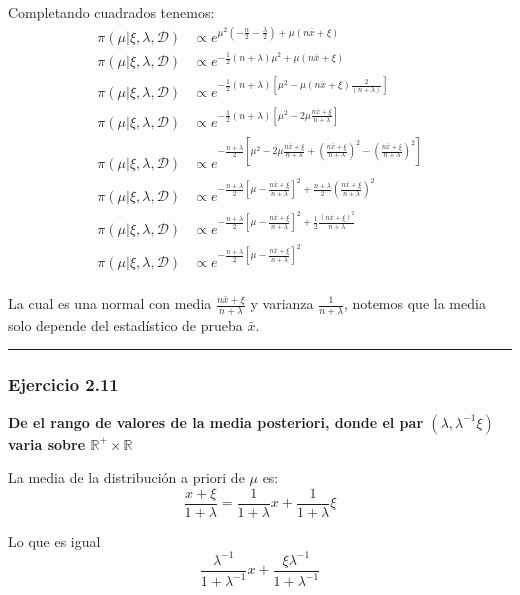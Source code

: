 \documentclass[12pt,]{article}
\begin{document}
Completando cuadrados tenemos: \[
\begin{array}{rl}
\pi(\mu|\xi,\lambda,\mathcal{D}) & \propto e^{ \mu^2(-\frac{n}{2}-\frac{\lambda}{2})+\mu(n\bar{x} +\xi)}\\
\pi(\mu|\xi,\lambda,\mathcal{D}) & \propto e^{ -\frac{1}{2}(n+\lambda)\mu^2+\mu(n\bar{x} +\xi)}\\
\pi(\mu|\xi,\lambda,\mathcal{D}) & \propto e^{ -\frac{1}{2}(n+\lambda)[\mu^2-\mu(n\bar{x} +\xi)\frac{2}{(n+\lambda)}]}\\
\pi(\mu|\xi,\lambda,\mathcal{D}) & \propto e^{ -\frac{1}{2}(n+\lambda)[\mu^2-2\mu\frac{n\bar{x}+ \xi}{n+\lambda}]}\\
\pi(\mu|\xi,\lambda,\mathcal{D}) & \propto e^{ -\frac{n+\lambda}{2}[\mu^2-2\mu\frac{n\bar{x} +\xi}{n+\lambda}+(\frac{n\bar{x}+ \xi}{n+\lambda})^2-(\frac{n\bar{x} +\xi}{n+\lambda})^2]}\\
\pi(\mu|\xi,\lambda,\mathcal{D}) & \propto e^{ -\frac{n+\lambda}{2}[\mu-\frac{n\bar{x}+ \xi}{n+\lambda}]^2+\frac{n+\lambda}{2}(\frac{n\bar{x} +\xi}{n+\lambda})^2}\\
\pi(\mu|\xi,\lambda,\mathcal{D}) & \propto e^{ -\frac{n+\lambda}{2}[\mu-\frac{n\bar{x} +\xi}{n+\lambda}]^2+\frac{1}{2}\frac{(n\bar{x} +\xi)^2}{n+\lambda}}\\
\pi(\mu|\xi,\lambda,\mathcal{D}) & \propto e^{ -\frac{n+\lambda}{2}[\mu-\frac{n\bar{x} +\xi}{n+\lambda}]^2}\\
\end{array}
\]

La cual es una normal con media \(\frac{n\bar{x} +\xi}{n+\lambda}\) y
varianza \(\frac{1}{n+\lambda}\), notemos que la media solo depende del
estadístico de prueba \(\bar x\).

\begin{center}\rule{0.5\linewidth}{\linethickness}\end{center}

\subsubsection{Ejercicio 2.11}\label{ejercicio-2.11}

\textbf{De el rango de valores de la media posteriori, donde el par
\((\lambda,\lambda^{-1}\xi)\) varia sobre
\(\mathbb{R}^+\times\mathbb{R}\)}

La media de la distribución a priori de \(\mu\) es:
\[\frac{x+\xi}{1+\lambda}=\frac{1}{1+\lambda}x+\frac{1}{1+\lambda}\xi\]

Lo que es igual
\[\frac{\lambda^{-1}}{1+\lambda^{-1}}x+\frac{\xi\lambda^{-1}}{1+\lambda^{-1}}\]
\end{document}

